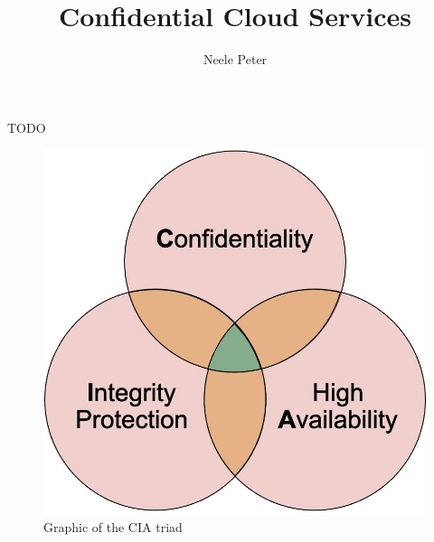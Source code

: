 \documentclass[sigconf]{acmart}
\title{Confidential Cloud Services}
\author{Neele Peter}
\affiliation{%
  \institution{Friedrich-Alexander-Universit\"at Erlangen-N\"urnberg}
  \country{}}
\begin{document}
	
	
\maketitle


TODO

	



\begin{figure}[t]
	\includegraphics[scale=0.25]{pictures/cia_triad}
	\caption{Graphic of the CIA triad}
	\label{cia}
\end{figure}





%



\newpage


	
\end{document}
